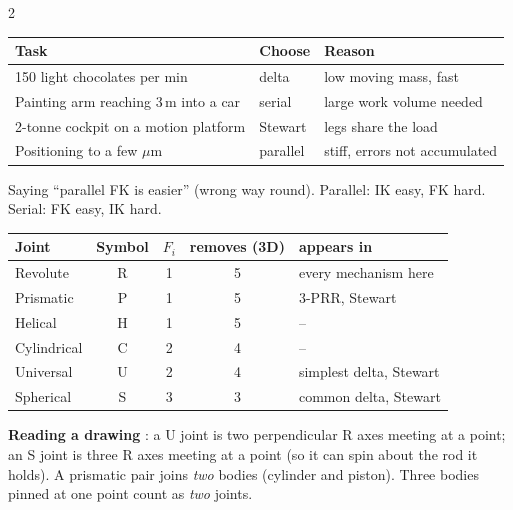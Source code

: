 \begin{multicols}{2}
\begin{worked}
\begin{tabularx}{\linewidth}{@{}XlX@{}}\toprule
Task & Choose & Reason\\\midrule
150 light chocolates per min & delta & low moving mass, fast\\
Painting arm reaching 3\,m into a car & serial & large work volume needed\\
2-tonne cockpit on a motion platform & Stewart & legs share the load\\
Positioning to a few $\mu$m & parallel & stiff, errors not accumulated\\\bottomrule
\end{tabularx}
\end{worked}
\begin{trap}
Saying ``parallel FK is easier'' (wrong way round). Parallel: IK easy, FK hard. Serial: FK easy, IK hard.
\end{trap}


\begin{fbx}
\begin{tabularx}{\linewidth}{@{}Xcccl@{}}\toprule
Joint & Symbol & $F_i$ & removes (3D) & appears in\\\midrule
Revolute & R & 1 & 5 & every mechanism here\\
Prismatic & P & 1 & 5 & 3-PRR, Stewart\\
Helical & H & 1 & 5 & --\\
Cylindrical & C & 2 & 4 & --\\
Universal & U & 2 & 4 & simplest delta, Stewart\\
Spherical & S & 3 & 3 & common delta, Stewart\\\bottomrule
\end{tabularx}
\end{fbx}
\textbf{Reading a drawing} \added: a U joint is two perpendicular R axes meeting at a point; an S joint is three R axes meeting at a point (so it can spin about the rod it holds). A prismatic pair joins \emph{two} bodies (cylinder and piston). Three bodies pinned at one point count as \emph{two} joints.


\end{multicols}
